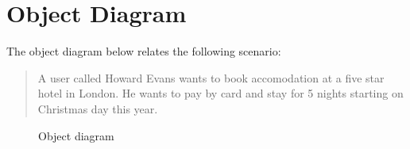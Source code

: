 \documentclass[a4paper]{article}
\begin{document}
\section{Object Diagram}

The object diagram below relates the following scenario:

\begin{quote}
	A user called Howard Evans wants to book accomodation at a five star hotel
	in London. He wants to pay by card and stay for 5 nights starting on
	Christmas day this year.
\end{quote}

\begin{figure}[h!]
	\centering
	\caption{Object diagram}
\end{figure}
\clearpage
\end{document}
